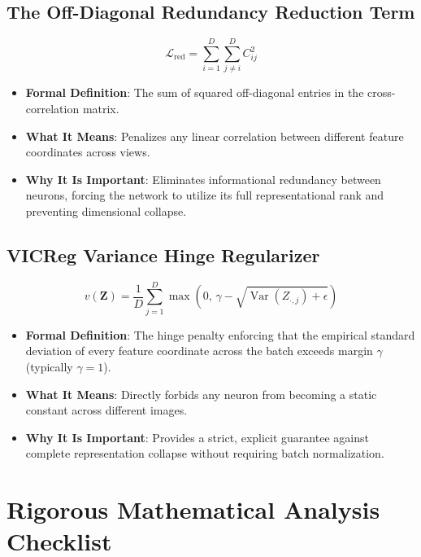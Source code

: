 \documentclass[11pt,a4paper]{article}
\theoremstyle{definition}
\begin{document}
\subsection{The Off-Diagonal Redundancy Reduction Term}
{\boldmath
\begin{equation}
\mathcal{L}_{\text{red}} = \sum_{i=1}^D \sum_{j \ne i}^D C_{ij}^2
\end{equation}
}
\begin{itemize}
    \item \textbf{Formal Definition}: The sum of squared off-diagonal entries in the cross-correlation matrix.
    \item \textbf{What It Means}: Penalizes any linear correlation between different feature coordinates across views.
    \item \textbf{Why It Is Important}: Eliminates informational redundancy between neurons, forcing the network to utilize its full representational rank and preventing dimensional collapse.
\end{itemize}

\subsection{VICReg Variance Hinge Regularizer}
{\boldmath
\begin{equation}
v(\mathbf{Z}) = \frac{1}{D} \sum_{j=1}^D \max\left( 0, \, \gamma - \sqrt{\operatorname{Var}(Z_{\cdot, j}) + \epsilon} \right)
\end{equation}
}
\begin{itemize}
    \item \textbf{Formal Definition}: The hinge penalty enforcing that the empirical standard deviation of every feature coordinate across the batch exceeds margin $\gamma$ (typically $\gamma = 1$).
    \item \textbf{What It Means}: Directly forbids any neuron from becoming a static constant across different images.
    \item \textbf{Why It Is Important}: Provides a strict, explicit guarantee against complete representation collapse without requiring batch normalization.
\end{itemize}

\section{Rigorous Mathematical Analysis Checklist}
\end{document}
